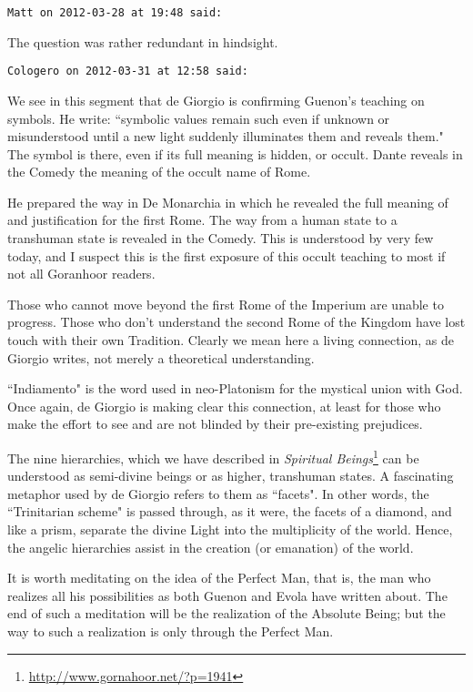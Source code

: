\begin{footnotesize}
\begin{sffamily}
\hfill

\texttt{Matt on 2012-03-28 at 19:48 said: }

The question was rather redundant in hindsight.


\hfill

\texttt{Cologero on 2012-03-31 at 12:58 said: }

We see in this segment that de Giorgio is confirming Guenon's teaching on symbols. He write: ``symbolic values remain such even if unknown or misunderstood until a new light suddenly illuminates them and reveals them." The symbol is there, even if its full meaning is hidden, or occult. Dante reveals in the Comedy the meaning of the occult name of Rome.

He prepared the way in De Monarchia in which he revealed the full meaning of and justification for the first Rome. The way from a human state to a transhuman state is revealed in the Comedy. This is understood by very few today, and I suspect this is the first exposure of this occult teaching to most if not all Goranhoor readers.

Those who cannot move beyond the first Rome of the Imperium are unable to progress. Those who don't understand the second Rome of the Kingdom have lost touch with their own Tradition. Clearly we mean here a living connection, as de Giorgio writes, not merely a theoretical understanding.

``Indiamento" is the word used in neo-Platonism for the mystical union with God. Once again, de Giorgio is making clear this connection, at least for those who make the effort to see and are not blinded by their pre-existing prejudices.

The nine hierarchies, which we have described in \textit{Spiritual Beings}\footnote{\url{http://www.gornahoor.net/?p=1941}} can be understood as semi-divine beings or as higher, transhuman states. A fascinating metaphor used by de Giorgio refers to them as ``facets". In other words, the ``Trinitarian scheme" is passed through, as it were, the facets of a diamond, and like a prism, separate the divine Light into the multiplicity of the world. Hence, the angelic hierarchies assist in the creation (or emanation) of the world.

It is worth meditating on the idea of the Perfect Man, that is, the man who realizes all his possibilities as both Guenon and Evola have written about. The end of such a meditation will be the realization of the Absolute Being; but the way to such a realization is only through the Perfect Man.



\end{sffamily}
\end{footnotesize}
